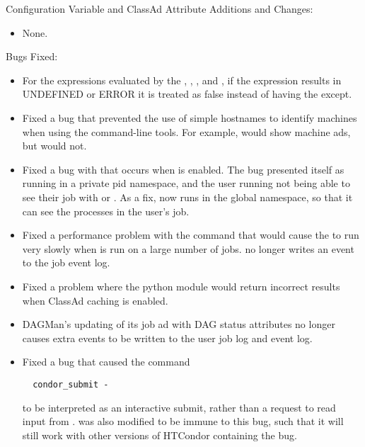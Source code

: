 \noindent Configuration Variable and ClassAd Attribute Additions and Changes:

\begin{itemize}

\item None.

\end{itemize}

\noindent Bugs Fixed:

\begin{itemize}

\item For the expressions evaluated by the  ,
, , and , if the expression results
in UNDEFINED or ERROR it is treated as false instead of having the
 except.

\item Fixed a bug that prevented the use of simple hostnames to identify
machines when using the command-line tools. For example, 
 would show machine ads, but
 would not.

\item Fixed a bug with  that occurs when
 is enabled.
The bug presented itself as 
running in a private pid namespace, 
and the user running  not being able to see 
their job with  or .
As a fix,  now runs in the global namespace, 
so that it can see the processes in the user's job.

\item Fixed a performance problem with the  command 
that would cause the  to run very slowly when 
 is run on a large number of jobs.  
 no longer writes an event to the job event log. 

\item Fixed a problem where the  python module would return
incorrect results when ClassAd caching is enabled.

\item DAGMan's updating of its job ad with DAG status attributes no
longer causes extra events to be written to the user job log and event log.

\item Fixed a bug that caused the command
\begin{verbatim}
  condor_submit -
\end{verbatim}
to be interpreted as an interactive submit,
rather than a request to read input from .
 was also modified to be immune to this bug,
such that it will still work with other versions of HTCondor containing
the bug.


\end{itemize}
